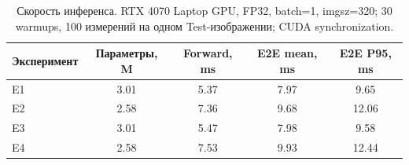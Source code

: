 \begin{table}[t]
\centering
\caption{Скорость инференса. RTX 4070 Laptop GPU, FP32, batch=1, imgsz=320; 30 warmups, 100 измерений на одном Test-изображении; CUDA synchronization.}
\label{tab:latency}
\scriptsize
\begin{tabular*}{\textwidth}{@{\extracolsep{\fill}}lcccc}
\hline
Эксперимент & Параметры, M & Forward, ms & E2E mean, ms & E2E P95, ms \\
\hline
E1 & 3.01 & 5.37 & 7.97 & 9.65 \\
E2 & 2.58 & 7.36 & 9.68 & 12.06 \\
E3 & 3.01 & 5.47 & 7.98 & 9.58 \\
E4 & 2.58 & 7.53 & 9.93 & 12.44 \\
\hline
\end{tabular*}
\end{table}
